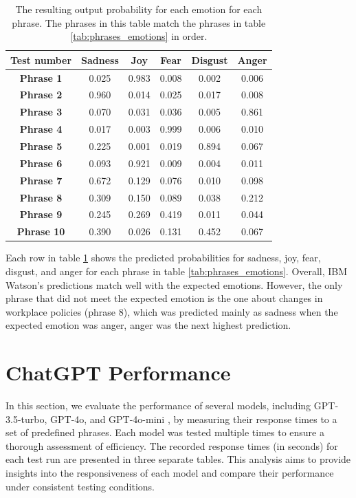 \begin{table}[h!]
\centering{}
\caption{The resulting output probability for each emotion for each phrase. The phrases in this table match the phrases in table \ref{tab:phrases_emotions} in order.}
\begin{tabular}{|c|c|c|c|c|c|}
\hline
\textbf{Test number} & \textbf{Sadness} & \textbf{Joy} & \textbf{Fear} & \textbf{Disgust} & \textbf{Anger} \\ \hline
\textbf{Phrase 1} & 0.025 & 0.983 & 0.008 & 0.002 & 0.006 \\ \hline
\textbf{Phrase 2} & 0.960 & 0.014 & 0.025 & 0.017 & 0.008 \\ \hline
\textbf{Phrase 3} & 0.070 & 0.031 & 0.036 & 0.005 & 0.861 \\ \hline
\textbf{Phrase 4} & 0.017 & 0.003 & 0.999 & 0.006 & 0.010 \\ \hline
\textbf{Phrase 5} & 0.225 & 0.001 & 0.019 & 0.894 & 0.067 \\ \hline
\textbf{Phrase 6} & 0.093 & 0.921 & 0.009 & 0.004 & 0.011 \\ \hline
\textbf{Phrase 7} & 0.672 & 0.129 & 0.076 & 0.010 & 0.098 \\ \hline
\textbf{Phrase 8} & 0.309 & 0.150 & 0.089 & 0.038 & 0.212 \\ \hline
\textbf{Phrase 9} & 0.245 & 0.269 & 0.419 & 0.011 & 0.044 \\ \hline
\textbf{Phrase 10}& 0.390 & 0.026 & 0.131 & 0.452 & 0.067 \\ \hline
\end{tabular}
\label{tab:test_results}
\end{table}

Each row in table \ref{tab:test_results} shows the predicted probabilities for sadness, joy, fear, disgust, and anger for each phrase in table \ref{tab:phrases_emotions}. Overall, IBM Watson's predictions match well with the expected emotions. However, the only phrase that did not meet the expected emotion is the one about changes in workplace policies (phrase 8), which was predicted mainly as sadness when the expected emotion was anger, anger was the next highest prediction.

\section{ChatGPT Performance}

In this section, we evaluate the performance of several models, including GPT-3.5-turbo, GPT-4o, and GPT-4o-mini \cite{openai2024}, by measuring their response times to a set of predefined phrases. Each model was tested multiple times to ensure a thorough assessment of efficiency. The recorded response times (in seconds) for each test run are presented in three separate tables. This analysis aims to provide insights into the responsiveness of each model and compare their performance under consistent testing conditions.

